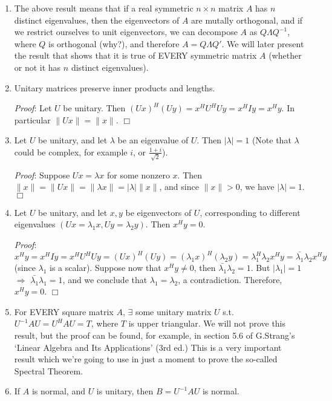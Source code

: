 \documentclass[12pt,oneside]{article}
\begin{document}
\begin{enumerate}
\item The above result means that if a real symmetric $n \times n$
  matrix $A$ has $n$ distinct eigenvalues, then the eigenvectors of
  $A$ are mutally orthogonal, and if we restrict ourselves to unit
  eigenvectors, we can decompose $A$ as $Q \Lambda Q^{-1}$, where
  $Q$ is orthogonal (why?), and therefore $A = Q \Lambda Q'$. We will
  later present the result that shows that it is true of EVERY
  symmetric matrix $A$ (whether or not it has $n$ distinct
  eigenvalues).


\item Unitary matrices preserve inner products and lengths.

\emph{Proof}: Let  $U$ be unitary. Then  $(Ux)^H (U y) = x^H U^H U y = x^H I y = x^H y$. In particular $\|Ux\| = \|x\|$. $\Box$

\item Let $U$ be unitary, and let $\lambda$ be an eigenvalue of
  $U$. Then $|\lambda| = 1$ (Note that $\lambda$ could be complex, for
  example $i$, or $\frac{1 + i}{\sqrt{2}}$).

\emph{Proof}: Suppose $Ux =  \lambda x$ for some nonzero $x$. Then $\|x\| = \|Ux\| = \|\lambda x\| = |\lambda| \|x\|$, and since $\|x\| > 0$, we have $|\lambda| =
  1$. $\Box$

\item Let $U$ be unitary, and let $x,y$ be eigenvectors of $U$,
  corresponding to different eigenvalues $(Ux = \lambda_1 x, Uy =
  \lambda_2 y)$. Then $x^H y = 0$.

\emph{Proof}: $x^H y = x^H I y = x^H U^H U
  y = (Ux)^H (Uy) = (\lambda_1 x)^H (\lambda_2 y) = \lambda_1^H
  \lambda_2 x^H y = \bar{\lambda_1} \lambda_2 x^H y$ (since
  $\lambda_1$ is a scalar). Suppose now that $x^H y \neq 0$, then
  $\bar{\lambda_1} \lambda_2 = 1$. But $|\lambda_1| = 1$
  $\Longrightarrow$ $\bar{\lambda_1} \lambda_1 = 1$, and we conclude
  that $\lambda_1 = \lambda_2$, a contradiction. Therefore, $x^H y =
  0$. $\Box$

\item For EVERY square matrix $A$, $\exists$ some unitary matrix $U$
  s.t. $U^{-1} A U = U^H A U = T$, where $T$ is upper triangular. We will not
  prove this result, but the proof can be found, for example, in
  section 5.6 of G.Strang's `Linear Algebra and Its Applications' (3rd
  ed.) This is a very important result which we're going to use in just
  a moment to prove the so-called Spectral Theorem.

\item If $A$ is normal, and $U$ is unitary, then $B = U^{-1} A U$ is
  normal.


\end{enumerate}
\end{document}
